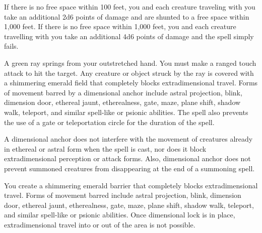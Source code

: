 \begin{multicols}{2}
\begin{small}
\smallskip\noindent If there is no free space within 100 feet, you and each creature traveling with you take an additional 2d6 points of damage and are shunted to a free space within 1,000 feet. If there is no free space within 1,000 feet, you and each creature travelling with you take an additional 4d6 points of damage and the spell simply fails.

\noindent A green ray springs from your outstretched hand. You must make a ranged touch attack to hit the target. Any creature or object struck by the ray is covered with a shimmering emerald field that completely blocks extradimensional travel. Forms of movement barred by a dimensional anchor include astral projection, blink, dimension door, ethereal jaunt, etherealness, gate, maze, plane shift, shadow walk, teleport, and similar spell-like or psionic abilities. The spell also prevents the use of a gate or teleportation circle for the duration of the spell.

\smallskip\noindent A dimensional anchor does not interfere with the movement of creatures already in ethereal or astral form when the spell is cast, nor does it block extradimensional perception or attack forms. Also, dimensional anchor does not prevent summoned creatures from disappearing at the end of a summoning spell.

\noindent You create a shimmering emerald barrier that completely blocks extradimensional travel. Forms of movement barred include astral projection, blink, dimension door, ethereal jaunt, etherealness, gate, maze, plane shift, shadow walk, teleport, and similar spell-like or psionic abilities. Once dimensional lock is in place, extradimensional travel into or out of the area is not possible.


\end{small}
\end{multicols}
